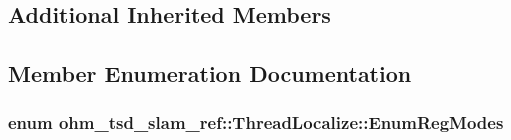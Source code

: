 \subsection*{Additional Inherited Members}


\subsection{Member Enumeration Documentation}
\hypertarget{classohm__tsd__slam__ref_1_1ThreadLocalize_ac5ed59506607265dc4c38a64cf36156f}{
\subsubsection[{Enum\-Reg\-Modes}]{\setlength{\rightskip}{0pt plus 5cm}enum {\bf ohm\-\_\-tsd\-\_\-slam\-\_\-ref\-::\-Thread\-Localize\-::\-Enum\-Reg\-Modes}\hspace{0.3cm}{\ttfamily [private]}}}\label{classohm__tsd__slam__ref_1_1ThreadLocalize_ac5ed59506607265dc4c38a64cf36156f}
